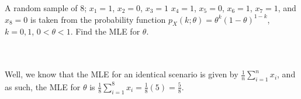 A random sample of 8; $x_1=1$, $x_2=0$, $x_3=1$ $x_4=1$, $x_5=0$, $x_6=1$, $x_7=1$, and $x_8=0$ is taken
from the probability function $p_X(k;\theta)=\theta^k(1-\theta)^{1-k}$, $k=0,1$, $0<\theta<1$. Find the
MLE for $\theta$.\\\\

\begin{solution}\renewcommand{\qedsymbol}{}\ \\
    Well, we know that the MLE for an identical scenario is given by $\frac1n\sum_{i=1}^nx_i$, and as
    such, the MLE for $\theta$ is $\frac18\sum_{i=1}^8x_i=\frac18(5)=\frac58$.

\end{solution}